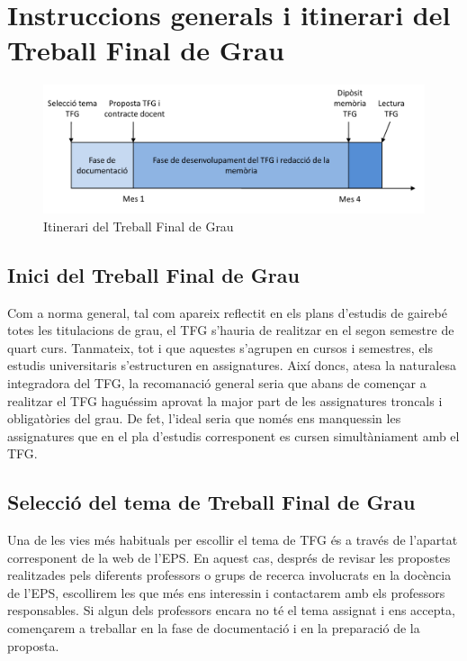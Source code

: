 
\chapter{Instruccions generals i itinerari del Treball Final de Grau }\label{instruccions}
\begin{figure}
\centering
\includegraphics[width=\linewidth]{./Imagenes/Itinerari_TFG.pdf}
\caption{\label{fig:itinerari}Itinerari del Treball Final de Grau}
\end{figure}

\section{Inici del Treball Final de Grau}

Com a norma general, tal com apareix reflectit en els plans d'estudis de gairebé totes les titulacions de grau, el \ac{TFG} s'hauria de realitzar en el segon semestre de quart curs. Tanmateix, tot i que aquestes s'agrupen en cursos i semestres, els estudis universitaris s'estructuren en assignatures. Així doncs, atesa la naturalesa integradora del \ac{TFG}, la recomanació general seria que abans de començar a realitzar el \ac{TFG} haguéssim aprovat la major part de les assignatures troncals i obligatòries del grau. De fet, l'ideal seria que només ens manquessin les assignatures que en el pla d'estudis corresponent es cursen simultàniament amb el \ac{TFG}.

\section{Selecció del tema de Treball Final de Grau}

Una de les vies més habituals per escollir el tema de \ac{TFG} és a través de l'apartat corresponent de la web de l'\acf{EPS}. En aquest cas, després de revisar les propostes realitzades pels diferents professors o grups de recerca involucrats en la docència de l'\ac{EPS}, escollirem les que més ens interessin i contactarem amb els professors responsables. Si algun dels professors encara no té el tema assignat i ens accepta, començarem a treballar en la fase de documentació i en la preparació de la proposta.

